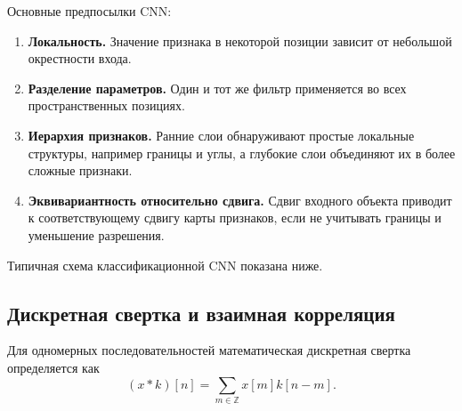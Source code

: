 \documentclass[12pt,a4paper]{article}
\numberwithin{equation}{section}
\theoremstyle{definition}
\theoremstyle{remark}
\begin{document}
Основные предпосылки CNN:

\begin{enumerate}
    \item \textbf{Локальность.}
    Значение признака в некоторой позиции зависит от небольшой
    окрестности входа.

    \item \textbf{Разделение параметров.}
    Один и тот же фильтр применяется во всех пространственных позициях.

    \item \textbf{Иерархия признаков.}
    Ранние слои обнаруживают простые локальные структуры, например
    границы и углы, а глубокие слои объединяют их в более сложные
    признаки.

    \item \textbf{Эквивариантность относительно сдвига.}
    Сдвиг входного объекта приводит к соответствующему сдвигу карты
    признаков, если не учитывать границы и уменьшение разрешения.
\end{enumerate}

Типичная схема классификационной CNN показана ниже.

\begin{center}
\end{center}

\subsection{Дискретная свертка и взаимная корреляция}

Для одномерных последовательностей математическая дискретная свертка
определяется как
\[
    (x*k)[n]
    =
    \sum_{m\in\mathbb{Z}} x[m]k[n-m].
\]
\end{document}
